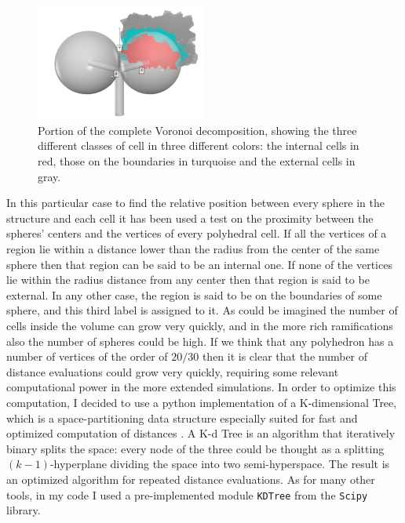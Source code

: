 \documentclass[12pt,a4paper]{report}
\begin{document}
    \begin{figure}
        \centering
        \includegraphics[width = 0.5\textwidth]{images/cell_id}
        \caption{Portion of the complete Voronoi decomposition, showing the three different classes of cell in three different colors: the internal cells in red, those on the boundaries in turquoise and the external cells in gray.}
        \label{fig:cell_id}
    \end{figure}

    In this particular case to find the relative position between every sphere in the structure and each cell it has been used a test on the proximity between the spheres' centers and the vertices of every polyhedral cell. If all the vertices of a region lie within a distance lower than the radius from the center of the same sphere then that region can be said to be an internal one. If none of the vertices lie within the radius distance from any center then that region is said to be external. In any other case, the region is said to be on the boundaries of some sphere, and this third label is assigned to it. As could be imagined the number of cells inside the volume can grow very quickly, and in the more rich ramifications also the number of spheres could be high. If we think that any polyhedron has a number of vertices of the order of $20/30$ then it is clear that the number of distance evaluations could grow very quickly, requiring some relevant computational power in the more extended simulations. In order to optimize this computation, I decided to use a python implementation of a K-dimensional Tree, which is a space-partitioning data structure especially suited for fast and optimized computation of distances \cite{10.1145/361002.361007}. A K-d Tree is an algorithm that iteratively binary splits the space: every node of the three could be thought as a splitting $(k-1)$-hyperplane dividing the space into two semi-hyperspace. The result is an optimized algorithm for repeated distance evaluations. As for many other tools, in my code I used a pre-implemented module \texttt{KDTree} from the \texttt{Scipy} library.
\end{document}
